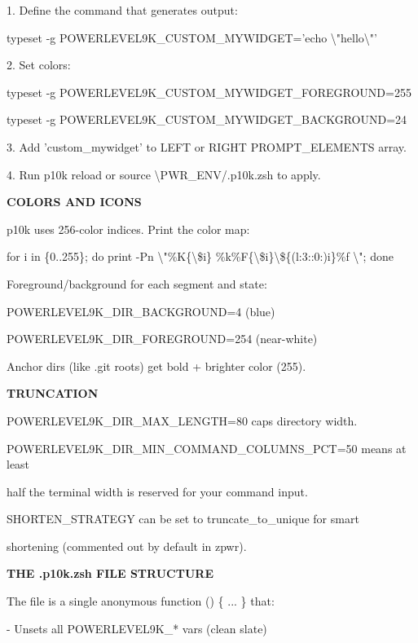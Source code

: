 \documentclass[11pt,a4paper,twoside]{book}
\begin{document}
1. Define the command that generates output:

typeset -g POWERLEVEL9K\_CUSTOM\_MYWIDGET='echo \textbackslash{}"hello\textbackslash{}"'

2. Set colors:

typeset -g POWERLEVEL9K\_CUSTOM\_MYWIDGET\_FOREGROUND=255

typeset -g POWERLEVEL9K\_CUSTOM\_MYWIDGET\_BACKGROUND=24

3. Add 'custom\_mywidget' to LEFT or RIGHT PROMPT\_ELEMENTS array.

4. Run p10k reload or source \textbackslash{}PWR\_ENV/.p10k.zsh to apply.


\vspace{12pt}
{\bfseries\color{neonyellow} COLORS AND ICONS}\vspace{4pt}

p10k uses 256-color indices. Print the color map:

for i in \{0..255\}; do print -Pn \textbackslash{}"\%K\{\textbackslash{}\$i\}  \%k\%F\{\textbackslash{}\$i\}\textbackslash{}\$\{(l:3::0:)i\}\%f \textbackslash{}"; done

Foreground/background for each segment and state:

POWERLEVEL9K\_DIR\_BACKGROUND=4        (blue)

POWERLEVEL9K\_DIR\_FOREGROUND=254      (near-white)

Anchor dirs (like .git roots) get bold + brighter color (255).


\vspace{12pt}
{\bfseries\color{neonyellow} TRUNCATION}\vspace{4pt}

POWERLEVEL9K\_DIR\_MAX\_LENGTH=80 caps directory width.

POWERLEVEL9K\_DIR\_MIN\_COMMAND\_COLUMNS\_PCT=50 means at least

half the terminal width is reserved for your command input.

SHORTEN\_STRATEGY can be set to truncate\_to\_unique for smart

shortening (commented out by default in zpwr).


\vspace{12pt}
{\bfseries\color{neonyellow} THE .p10k.zsh FILE STRUCTURE}\vspace{4pt}

The file is a single anonymous function () \{ ... \} that:

- Unsets all POWERLEVEL9K\_* vars (clean slate)
\end{document}
